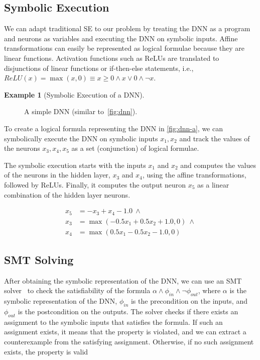 \documentclass[oneside,11pt,dvipsnames]{book}
\numberwithin{equation}{section}
\theoremstyle{definition}
\newtheorem{example}{Example}[section]
\theoremstyle{remark}
\begin{document}
\subsection{Symbolic Execution}\label{sec:se}
We can adapt traditional SE to our problem by treating the DNN as a program and neurons as variables and executing the DNN on symbolic inputs. Affine transformations can easily be represented as logical formulae because they are linear functions. Activation functions such as ReLUs are translated to disjunctions of linear functions or if-then-else statements, i.e., $ReLU(x) = \max(x,0) \equiv x \ge 0 \land x \lor 0 \land \neg x$.

\begin{example}[Symbolic Execution of a DNN]\label{ex:se-dnn}

\begin{figure}
\centering
\mydnn
\caption{\label{fig:dnn-a}A simple DNN (similar to~\autoref{fig:dnn}).}
\end{figure}    

To create a logical formula representing the DNN in \autoref{fig:dnn-a}, we can symbolically execute the DNN on symbolic inputs $x_1,x_2$ and track the values of the neurons $x_3, x_4, x_5$ as a set (conjunction) of logical formulae. 

The symbolic execution starts with the inputs $x_1$ and $x_2$ and computes the values of the neurons in the hidden layer, $x_3$ and $x_4$, using the affine transformations, followed by ReLUs. Finally, it computes the output neuron $x_5$ as a linear combination of the hidden layer neurons.

\begin{equation}\label{eq:se-dnn}
    \begin{split}
x_5 &= -x_3 + x_4 - 1.0 ~\land \\
x_3 &= \max(-0.5x_1 + 0.5x_2 + 1.0, 0) ~\land \\
x_4 &= \max(0.5x_1 - 0.5x_2 - 1.0, 0)
    \end{split}
\end{equation}

\end{example}

\subsection{SMT Solving}\label{sec:smt}
After obtaining the symbolic representation of the DNN, we can use an SMT solver~\cite{barrett2010smt} to check the satisfiability of the formula $\alpha \land \phi_{in} \land \neg \phi_{out} $, where $\alpha$ is the symbolic representation of the DNN, $\phi_{in}$ is the precondition on the inputs, and $\phi_{out}$ is the postcondition on the outputs. The solver checks if there exists an assignment to the symbolic inputs that satisfies the formula. If such an assignment exists, it means that the property is violated, and we can extract a counterexample from the satisfying assignment. Otherwise, if no such assignment exists, the property is valid
\end{document}
